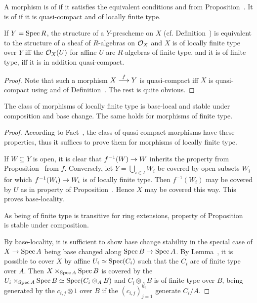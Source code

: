 \documentclass[a4paper,parskip=half,numbers=enddot, DIV=12]{scrreprt}
\begin{document}
\begin{defi}
    A morphism is of  if it satisfies the equivalent conditions  and  from Proposition~. It is of  if it is quasi-compact and of locally finite type.
\end{defi}

\begin{fact}
    If $Y=\operatorname{Spec} R$, the structure of a $Y$-prescheme on $X$ (cf. Definition~) is equivalent to the structure of a sheaf of $R$-algebras on $\mathcal{O}_X$ and $X$ is of locally finite type over $Y$ iff the $\mathcal{O}_X(U)$ for affine $U$ are $R$-algebras of finite type, and it is of finite type, iff it is in addition quasi-compact.
\end{fact}
\begin{proof}
	Note that such a  morphism $X\morphism[f]Y$ is quasi-compact iff $X$ is quasi-compact using \itememph{\alpha} and \itememph{\gamma} of Definition~. The rest is quite obvious.
\end{proof}
\begin{fact}
    The class of morphisms of locally finite type is base-local and stable under composition and base change. The same holds for morphisms of finite type. 
\end{fact}
\begin{proof}
    According to Fact~, the class of quasi-compact morphisms have these properties, thus it suffices to prove them for morphisms of locally finite type. 
    
    If $W\subseteq Y$ is open, it is clear that $f^{-1}(W)\morphism W$ inherits the property  from Proposition~ from $f$. Conversely, let $Y=\bigcup_{i\in I}W_i$ be covered by open subsets $W_i$ for which $f^{-1}(W_i)\morphism W_i$ is of locally finite type. Then $f^{-1}(W_i)$ may be covered by $U$ as in property  of Proposition~. Hence $X$ may be covered this way. This proves base-locality.
    
    As being of finite type is transitive for ring extensions, property  of Proposition~ is stable under composition.
    
    By base-locality, it is sufficient to show base change stability in the special case of $X\morphism \Spec A$ being base changed along $\Spec B\morphism \Spec A$. By Lemma~, it is possible to cover $X$ by affine $U_i\simeq \operatorname{Spec}(C_i)$ such that the $C_i$ are of finite type over $A$. Then $X\times_{\operatorname{Spec} A} \operatorname{Spec} B$ is covered by the $U_i\times_{\operatorname{Spec} A} \operatorname{Spec} B \simeq \operatorname{Spec}(C_i\otimes_A B)$ and $C_i\otimes_A B$ is of finite type over $B$, being generated by the $c_{i,j}\otimes 1$ over $B$ if the $(c_{i,j})_{j=1}^{n_i}$ generate $C_i/A$.
\end{proof}
\end{document}
